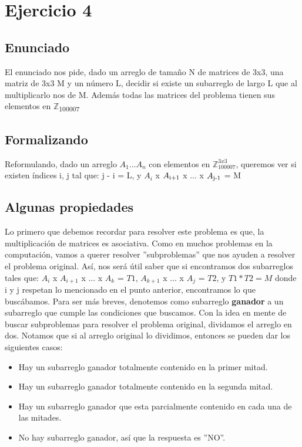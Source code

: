 \section{Ejercicio 4}

\subsection{Enunciado}
El enunciado nos pide, dado un arreglo de tamaño N de matrices de 3x3, una matriz de 3x3 M y un número L, decidir
si existe un subarreglo de largo L que al multiplicarlo nos de M.
Además todas las matrices del problema tienen sus elementos en $\mathbb{Z}$\textsubscript{100007}

\subsection{Formalizando}
Reformulando, dado un arreglo $A_1...A_n$ con elementos en  $\mathbb{Z}^{3x3}_{100007}$, queremos ver si existen índices
i, j tal que:
\newline
j - i = L, y 
\newline
$A_i$ x $A\textsubscript{i+1}$ x ... x $A\textsubscript{j-1}$ = M  

\subsection{Algunas propiedades}
Lo primero que debemos recordar para resolver este problema es que, la multiplicación de matrices es asociativa.
Como en muchos problemas en la computación, vamos a querer resolver ''subproblemas''
que nos ayuden a resolver el problema original. Así, nos será útil saber que si encontramos dos subarreglos tales que:
\newline
$A_i$ x $A_{i+1}$ x ... x $A_k$ = $T1$,
\newline
$A_{k+1}$ x ... x $A_j$ = $T2$, y 
\newline
$T1 * T2 = M$
\newline
donde i y j
respetan lo mencionado en el punto anterior, 
encontramos lo que buscábamos.
\newline
Para ser más breves, denotemos como subarreglo \textbf{ganador} a un subarreglo que cumple las condiciones que buscamos.
Con la idea en mente de buscar subproblemas para resolver el problema original, dividamos el arreglo en dos.
Notamos que si al arreglo original lo dividimos, entonces se pueden dar los siguientes casos:
\begin{itemize}
\item Hay un subarreglo ganador totalmente contenido en la primer mitad.
\item Hay un subarreglo ganador totalmente contenido en la segunda mitad.
\item Hay un subarreglo ganador que esta parcialmente contenido en cada una de las mitades.
\item No hay subarreglo ganador, así que la respuesta es ''NO''.
\end{itemize}


